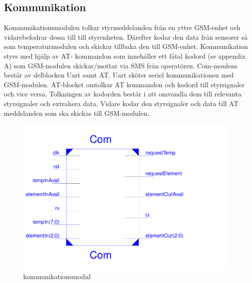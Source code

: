 \documentclass[a4paper]{scrartcl}
\begin{document}
	\subsection{Kommunikation}
		Kommunikationsmodulen tolkar styrmeddelanden från en yttre GSM-enhet och vidarebefodrar  dessa till till styrenheten. Därefter kodar den data från sensorer så som temperaturmodulen och skickar tillbaka den till GSM-enhet. Kommunikation styrs med hjälp 			av AT-	kommandon som innehåller ett fåtal kodord (se appendix A) som GSM-modulen skickar/mottar  via SMS från operatören.
		Com-moulens består av delblocken Uart samt AT. Uart sköter seriel kommunikationen med GSM-modulen. AT-blocket omtolkar AT kommandon och kodord till styrsignaler och vice versa.
		Tolkningen av kodorden består i att omvandla dem till relevanta styrsignaler och extrahera data. Vidare kodar den styrsignaler och data till AT meddelanden som ska skickas till GSM-modulen.
			\begin{figure}[H]
				\centering
				\includegraphics[scale=0.3]{comschematic.pdf}
				\caption{kommunikationsmodul}
			\end{figure}
\end{document}
